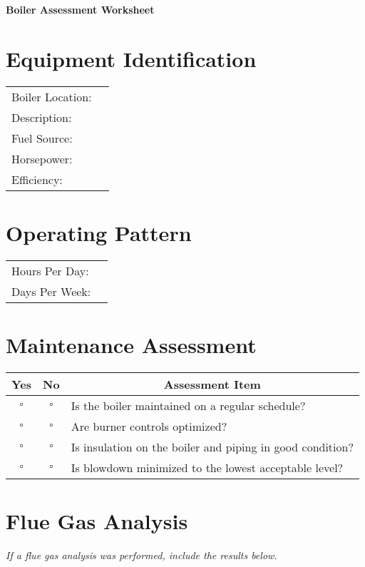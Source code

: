 \documentclass[./main.tex]{subfiles}
\begin{document}
\begin{center}
\Large\textbf{Boiler Assessment Worksheet}
\end{center}

\section*{Equipment Identification}
\noindent\begin{tabularx}{\textwidth}{@{}lX@{}}
Boiler Location: & \hrulefill \\[2ex]
Description: & \hrulefill \\[2ex]
Fuel Source: & \hrulefill \\[2ex]
Horsepower: & \hrulefill \\[2ex]
Efficiency: & \hrulefill \\[2ex]
\end{tabularx}

\section*{Operating Pattern}
\noindent\begin{tabularx}{\textwidth}{@{}lX@{}}
Hours Per Day: & \hrulefill \\[2ex]
Days Per Week: & \hrulefill \\[2ex]
\end{tabularx}

\section*{Maintenance Assessment}
\begin{tabular}{|c|c|p{14cm}|}
\hline
\multicolumn{1}{|c|}{\textbf{Yes}} & \multicolumn{1}{c|}{\textbf{No}} & \multicolumn{1}{c|}{\textbf{Assessment Item}} \\
\hline
$\square$ & $\square$ & Is the boiler maintained on a regular schedule? \\
\hline
$\square$ & $\square$ & Are burner controls optimized? \\
\hline
$\square$ & $\square$ & Is insulation on the boiler and piping in good condition? \\
\hline
$\square$ & $\square$ & Is blowdown minimized to the lowest acceptable level? \\
\hline
\end{tabular}

\section*{Flue Gas Analysis}
\emph{If a flue gas analysis was performed, include the results below. }
\end{document}
